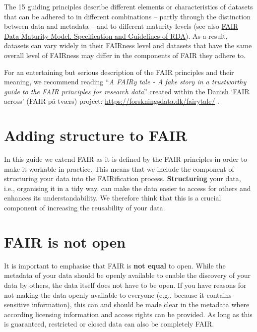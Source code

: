 \documentclass[
  oneside]{book}
\begin{document}
The 15 guiding principles describe different elements or characteristics of datasets that can be adhered to in different combinations -- partly through the distinction between data and metadata -- and to different maturity levels (see also \href{https://zenodo.org/records/3909563}{FAIR Data Maturity Model. Specification and Guidelines of RDA}). As a result, datasets can vary widely in their FAIRness level and datasets that have the same overall level of FAIRness may differ in the components of FAIR they adhere to.

\begin{infobox}

For an entertaining but serious description of the FAIR principles and their meaning, we recommend reading ``\emph{A FAIRy tale - A fake story in a trustworthy guide to the FAIR principles for research data}'' created within the Danish `FAIR across' (FAIR på tværs) project: \url{https://forskningsdata.dk/fairytale/} \autocite{FAIRy_tale}.

\end{infobox}

\section{Adding structure to FAIR}\label{adding-structure-to-fair}

In this guide we extend FAIR as it is defined by the FAIR principles in order to make it workable in practice. This means that we include the component of structuring your data into the FAIRification process. \textbf{Structuring} your data, i.e., organising it in a tidy way, can make the data easier to access for others and enhances its understandability. We therefore think that this is a crucial component of increasing the reusability of your data.

\section{FAIR is not open}\label{fair-is-not-open}

It is important to emphasise that FAIR is \textbf{not equal} to open. While the metadata of your data should be openly available to enable the discovery of your data by others, the data itself does not have to be open. If you have reasons for not making the data openly available to everyone (e.g., because it contains sensitive information), this can and should be made clear in the metadata where according licensing information and access rights can be provided. As long as this is guaranteed, restricted or closed data can also be completely FAIR.
\end{document}
